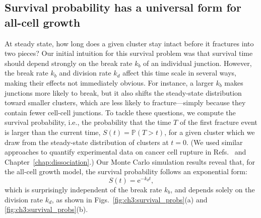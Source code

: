 \subsection{Survival probability has a universal form for all-cell growth}
\label{sec:ch3:survival}

At steady state, how long does a given cluster stay intact before it fractures into two pieces? Our initial intuition for this survival problem was that survival time should depend strongly on the break rate $k_b$ of an individual junction. However, the break rate $k_b$ and division rate $k_d$ affect this time scale in several ways, making their effects not immediately obvious. For instance, a larger $k_b$ makes junctions more likely to break, but it also shifts the steady-state distribution toward smaller clusters, which are less likely to fracture---simply because they contain fewer cell-cell junctions. To tackle these questions, we compute the survival probability, i.e., the probability that the time $T$ of the first fracture event is larger than the current time, $S(t)=\mathbb{P}(T>t)$, for a given cluster which we draw from the steady-state distribution of clusters at $t = 0$. (We used similar approaches to quantify experimental data on cancer cell rupture in Refs.~\cite{law2023cytokinesis,wang2025confinement} and Chapter~\ref{chap:dissociation}.) Our Monte Carlo simulation results reveal that, for the all-cell growth model, the survival probability follows an exponential form:
\begin{equation}
    S(t)=\mathrm{e}^{-k_d t},
\end{equation}
which is surprisingly independent of the break rate $k_b$, and depends solely on the division rate $k_d$, as shown in Figs.~\ref{fig:ch3:survival_probs}(a) and \ref{fig:ch3:survival_probs}(b).

